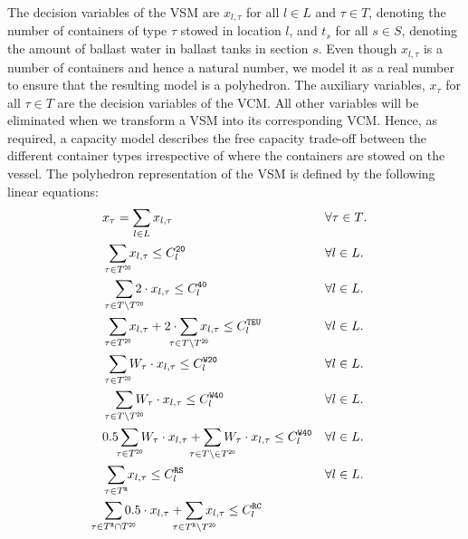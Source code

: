 \documentclass[citeauthoryear]{llncs}
\newcommand{\trt}[1]{\texttt{#1}}
\begin{document}
The decision variables of the VSM are $x_{l,\tau}$ for all $l\in L$ and $\tau \in T$, denoting the number of containers of type $\tau$ stowed in location $l$, and $t_s$ for all $s\in S$, denoting the amount of ballast water in ballast tanks in section $s$. Even though $x_{l,\tau}$ is a number of containers and hence a natural number, we model it as a real number to ensure that the resulting model is a polyhedron. The auxiliary variables, $x_\tau$ for all $\tau\in T$ are the decision variables of the VCM. All other variables will be eliminated when we transform a VSM into its corresponding VCM. Hence, as required, a capacity model describes the free capacity trade-off between the different container types irrespective of where the containers are stowed on the vessel. The polyhedron representation of the VSM is defined by the following linear equations:
\begin{align}
	\label{typeDef}
	&x_\tau = \sum_{l\in L} x_{l,\tau} 
			&& \forall{\tau \in T}.\\
		\label{20Cap}
	&\smashoperator[r]{\sum_{\tau \in T^\trt{20}}} x_{l,\tau} \leq C_l^\trt{20}
			&& \forall l \in L.\\
	\label{40Cap}    	
	&\smashoperator[r]{\sum_{\tau \in T\setminus T^\trt{20}}} 2\cdot x_{l,\tau} \leq C_l^\trt{40} 
			&& \forall l \in L.\\
	\label{teuCap}
	&\smashoperator[r]{\sum_{\tau \in T^\trt{20}}} x_{l,\tau} + 2\cdot\smashoperator[lr]{\sum_{\tau \in T\setminus T^\trt{20}}} x_{l,\tau} \leq C_l^\trt{TEU} 
			&& \forall l \in L.\\
	\label{weight20Cap}
	&\smashoperator[r]{\sum_{\tau \in T^\trt{20}}} W_\tau\cdot x_{l,\tau} \leq C_l^\trt{W20} 
			&& \forall l \in L.\\
	\label{weight40Cap}
	&\smashoperator[r]{\sum_{\tau \in T\setminus T^\trt{20}}} W_\tau\cdot x_{l,\tau} \leq C_l^\trt{W40} 
			&& \forall l \in L. \\
	\label{combinedWeightCap}
	&0.5 \smashoperator[lr]{\sum_{\tau \in T^\trt{20}}} W_\tau\cdot x_{l,\tau} + \smashoperator[lr]{\sum_{\tau \in T\setminus \in T^\trt{20}}} W_\tau\cdot x_{l,\tau} \leq C_l^\trt{W40} 
			&& \forall l \in L.\\
	\label{reeferSlotCap}
	&\smashoperator[r]{\sum_{\tau \in T^\trt{R}}} x_{l,\tau} \leq C_l^\trt{RS} 
			&& \forall l \in L. \\
	\label{reeferCellCap}
	&\smashoperator[lr]{\sum_{\tau \in T^\trt{R}\cap T^\trt{20}}} 0.5\cdot x_{l,\tau} + \smashoperator[lr]{\sum_{\tau \in T^\trt{R}\setminus T^\trt{20}}} x_{l,\tau} \leq C_l^\trt{RC} 

\end{align}
\end{document}
